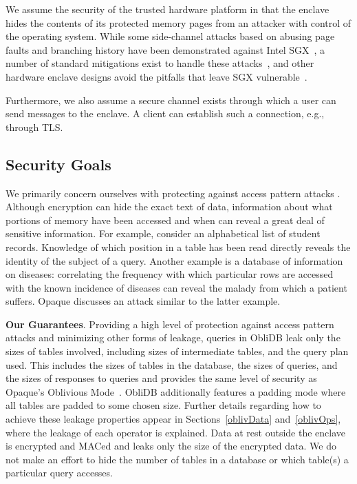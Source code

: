 \documentclass[letterpaper,twocolumn,10pt]{article}
\newcommand{\ignore}[1]{}
\def\name/{ObliDB}
\begin{document}
We assume the security of the trusted hardware platform in that the enclave hides the contents of its protected memory pages from an attacker with control of the operating system. While some side-channel attacks based on abusing page faults and branching history have been demonstrated against Intel SGX~\cite{LSG+16,XCP15}, a number of standard mitigations exist to handle these attacks~\cite{SCNS16,RLT15,SLK+17,SLKP17}, and other hardware enclave designs avoid the pitfalls that leave SGX vulnerable~\cite{CLD16, LHM+15, MLS+13}.

Furthermore, we also assume a secure channel exists through which a user can send messages to the enclave. A client can establish such a connection, e.g., through TLS. \ignore{ (this is fairly straightforward with SGX), but we did not implement this for our tests, as it is not directly related to the functionality provided by \name/.}

\subsection{Security Goals}
We primarily concern ourselves with protecting against access pattern attacks \cite{IKK12}. Although encryption can hide the exact text of data, information about what portions of memory have been accessed and when can reveal a great deal of sensitive information. For example, consider an alphabetical list of student records. Knowledge of which position in a table has been read directly reveals the identity of the subject of a query. Another example is a database of information on diseases: correlating the frequency with which particular rows are accessed with the known incidence of diseases can reveal the malady from which a patient suffers. Opaque \cite{ZDB+17} discusses an attack similar to the latter example.

\noindent \textbf{Our Guarantees}. Providing a high level of protection against access pattern attacks and minimizing other forms of leakage, queries in \name/ leak only the sizes of tables involved, including sizes of intermediate tables, and the query plan used. This includes the sizes of tables in the database, the sizes of queries, and the sizes of responses to queries and provides the same level of security as Opaque's Oblivious Mode~\cite{ZDB+17}. \name/ additionally features a padding mode where all tables are padded to some chosen size. Further details regarding how to achieve these leakage properties appear in Sections~\ref{oblivData} and~\ref{oblivOps}, where the leakage of each operator is explained. Data at rest outside the enclave is encrypted and MACed and leaks only the size of the encrypted data. We do not make an effort to hide the number of tables in a database or which table(s) a particular query accesses.
\end{document}
